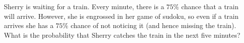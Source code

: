 Sherry is waiting for a train. Every minute, there is a $75\%$ chance that a train will arrive.
However, she is engrossed in her game of sudoku, so even if a train arrives she has a $75\%$ chance of not noticing it (and hence missing the train).
What is the probability that Sherry catches the train in the next five minutes?